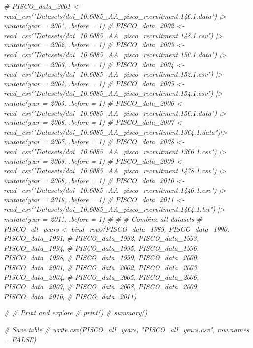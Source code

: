 \documentclass[
]{article}
\newenvironment{Shaded}{\begin{snugshade}}{\end{snugshade}}
\newcommand{\CommentTok}[1]{\textcolor[rgb]{0.56,0.35,0.01}{\textit{#1}}}
\begin{document}
\begin{Shaded}
\begin{Highlighting}[]
\CommentTok{\# PISCO\_data\_2001 \textless{}{-} read\_csv("Datasets/doi\_10.6085\_AA\_pisco\_recruitment.146.1.data") |\textgreater{} mutate(year = 2001, .before = 1)}
\CommentTok{\# PISCO\_data\_2002 \textless{}{-} read\_csv("Datasets/doi\_10.6085\_AA\_pisco\_recruitment.148.1.csv")  |\textgreater{} mutate(year = 2002, .before = 1)}
\CommentTok{\# PISCO\_data\_2003 \textless{}{-} read\_csv("Datasets/doi\_10.6085\_AA\_pisco\_recruitment.150.1.data") |\textgreater{} mutate(year = 2003, .before = 1)}
\CommentTok{\# PISCO\_data\_2004 \textless{}{-} read\_csv("Datasets/doi\_10.6085\_AA\_pisco\_recruitment.152.1.csv")  |\textgreater{} mutate(year = 2004, .before = 1)}
\CommentTok{\# PISCO\_data\_2005 \textless{}{-} read\_csv("Datasets/doi\_10.6085\_AA\_pisco\_recruitment.154.1.csv")  |\textgreater{} mutate(year = 2005, .before = 1)}
\CommentTok{\# PISCO\_data\_2006 \textless{}{-} read\_csv("Datasets/doi\_10.6085\_AA\_pisco\_recruitment.156.1.data") |\textgreater{} mutate(year = 2006, .before = 1)}
\CommentTok{\# PISCO\_data\_2007 \textless{}{-} read\_csv("Datasets/doi\_10.6085\_AA\_pisco\_recruitment.1364.1.data")|\textgreater{} mutate(year = 2007, .before = 1)}
\CommentTok{\# PISCO\_data\_2008 \textless{}{-} read\_csv("Datasets/doi\_10.6085\_AA\_pisco\_recruitment.1366.1.csv") |\textgreater{} mutate(year = 2008, .before = 1)}
\CommentTok{\# PISCO\_data\_2009 \textless{}{-} read\_csv("Datasets/doi\_10.6085\_AA\_pisco\_recruitment.1438.1.csv") |\textgreater{} mutate(year = 2009, .before = 1)}
\CommentTok{\# PISCO\_data\_2010 \textless{}{-} read\_csv("Datasets/doi\_10.6085\_AA\_pisco\_recruitment.1446.1.csv") |\textgreater{} mutate(year = 2010, .before = 1)}
\CommentTok{\# PISCO\_data\_2011 \textless{}{-} read\_csv("Datasets/doi\_10.6085\_AA\_pisco\_recruitment.1464.1.txt") |\textgreater{} mutate(year = 2011, .before = 1)}
\CommentTok{\# }
\CommentTok{\# \# Combine all datasets}
\CommentTok{\# PISCO\_all\_years \textless{}{-} bind\_rows(PISCO\_data\_1989, PISCO\_data\_1990, PISCO\_data\_1991, }
\CommentTok{\#                              PISCO\_data\_1992, PISCO\_data\_1993, PISCO\_data\_1994, }
\CommentTok{\#                              PISCO\_data\_1995, PISCO\_data\_1996, PISCO\_data\_1998,}
\CommentTok{\#                              PISCO\_data\_1999, PISCO\_data\_2000, PISCO\_data\_2001,}
\CommentTok{\#                              PISCO\_data\_2002, PISCO\_data\_2003, PISCO\_data\_2004, }
\CommentTok{\#                              PISCO\_data\_2005, PISCO\_data\_2006, PISCO\_data\_2007, }
\CommentTok{\#                              PISCO\_data\_2008, PISCO\_data\_2009, PISCO\_data\_2010, }
\CommentTok{\#                              PISCO\_data\_2011)}

\CommentTok{\# \# Print and explore}
\CommentTok{\# print()}
\CommentTok{\# summary()}
 
\CommentTok{\# Save table}
\CommentTok{\# write.csv(PISCO\_all\_years, "PISCO\_all\_years.csv", row.names = FALSE)}
\end{Highlighting}
\end{Shaded}
\end{document}
